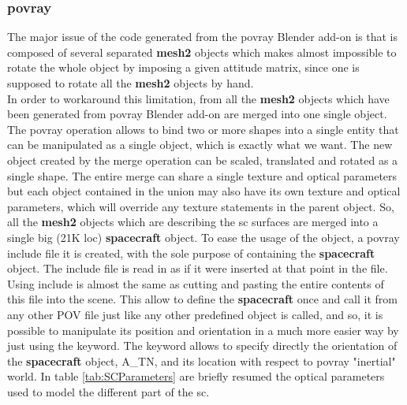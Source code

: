 \subsubsection{\acrshort{povray}}
The major issue of the code generated from the  \acrshort{povray} Blender add-on is that is composed of several separated \textbf{mesh2} objects which makes almost impossible to rotate the whole object by imposing a given attitude matrix, since one is supposed to rotate all the \textbf{mesh2} objects by hand.\\
In order to workaround this limitation, from all the \textbf{mesh2} objects which have been generated from \acrshort{povray} Blender add-on are merged into one single  object.
The  \acrshort{povray} operation allows to bind two or more shapes into a single entity that can be manipulated as a single object, which is exactly what we want. The new object created by the merge operation can be scaled, translated and rotated as a single shape. The entire merge can share a single texture and optical parameters but each object contained in the union may also have its own texture and optical parameters, which will override any texture statements in the parent object. So, all the \textbf{mesh2} objects which are describing the \acrshort{sc} surfaces are merged into a single big (21K \acrshort{loc}) \textbf{spacecraft}  object.
To ease the usage of the  object, a \acrshort{povray} include file it is created, with the sole purpose of containing the \textbf{spacecraft}  object.
The include file is read in as if it were inserted at that point in the file. Using include is almost the same as cutting and pasting the entire contents of this file into the scene. This allow to define the \textbf{spacecraft}  once and call it from any other POV file just like any other predefined object is called, and so, it is possible to manipulate its position and orientation in a much more easier way by just using the  keyword. The  keyword  allows to specify directly the orientation of the \textbf{spacecraft} object, \gls{A_TN}, and its location with respect to \acrshort{povray} "inertial" world.
In table \ref{tab:SCParameters} are briefly resumed the optical parameters used to model the different part of the \acrshort{sc}.


